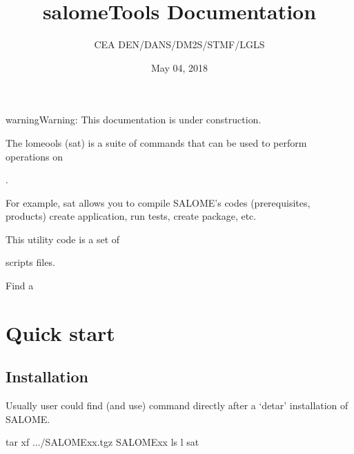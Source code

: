 \documentclass[a4paper,10pt,english]{sphinxmanual}
\title{salomeTools Documentation}
\date{May 04, 2018}
\author{CEA DEN/DANS/DM2S/STMF/LGLS}
\begin{document}
\maketitle
\sphinxtableofcontents
{}\label{\detokenize{index::doc}}
\clearpage




\begin{sphinxadmonition}{warning}{Warning:}
This documentation is under construction.
\end{sphinxadmonition}

The lomeools (sat) is a suite of commands
that can be used to perform operations on %
\begin{footnote}[1]\sphinxAtStartFootnote
{}
%
\end{footnote}.

For example, sat allows you to compile SALOME’s codes
(prerequisites, products)
create application, run tests, create package, etc.

This utility code is a set of %
\begin{footnote}[2]\sphinxAtStartFootnote
{}
%
\end{footnote} scripts files.

Find a 


\chapter{Quick start}
\label{\detokenize{index:quick-start}}\label{\detokenize{index:salome-tools}}

\section{Installation}
\label{\detokenize{installation_of_sat:installation}}\label{\detokenize{installation_of_sat::doc}}
Usually user could find (and use) command  directly after a ‘detar’ installation of SALOME.

%
\begin{sphinxVerbatim}[commandchars=\\\{\}]
tar \PYGZhy{}xf .../SALOME\PYGZus{}xx.tgz
 SALOME\PYGZus{}xx
ls \PYGZhy{}l sat      
\end{sphinxVerbatim}
\end{document}
